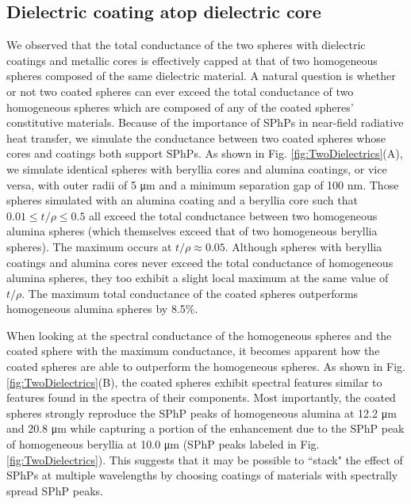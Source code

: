 \subsection{Dielectric coating atop dielectric core}

We observed that the total conductance of the two spheres with dielectric coatings and metallic cores is effectively capped at that of two homogeneous spheres composed of the same dielectric material. A natural question is whether or not two coated spheres can ever exceed the total conductance of two homogeneous spheres which are composed of any of the coated spheres' constitutive materials. Because of the importance of SPhPs in near-field radiative heat transfer, we simulate the conductance between two coated spheres whose cores and coatings both support SPhPs. As shown in Fig. \ref{fig:TwoDielectrics}(A), we simulate identical spheres with beryllia\cite{Palik1985} cores and alumina\cite{Palik1985} coatings, or vice versa, with outer radii of 5 \si{\micro\meter} and a minimum separation gap of 100 \si{\nano\meter}. Those spheres simulated with an alumina coating and a beryllia core such that $0.01 \le t/\rho \le 0.5$ all exceed the total conductance between two homogeneous alumina spheres (which themselves exceed that of two homogeneous beryllia spheres). The maximum occurs at $t/\rho \approx 0.05$. Although spheres with beryllia coatings and alumina cores never exceed the total conductance of homogeneous alumina spheres, they too exhibit a slight local maximum at the same value of $t/\rho$. The maximum total conductance of the coated spheres outperforms homogeneous alumina spheres by 8.5\%.

When looking at the spectral conductance of the homogeneous spheres and the coated sphere with the maximum conductance, it becomes apparent how the coated spheres are able to outperform the homogeneous spheres. As shown in Fig. \ref{fig:TwoDielectrics}(B), the coated spheres exhibit spectral features similar to features found in the spectra of their components. Most importantly, the coated spheres strongly reproduce the SPhP peaks of homogeneous alumina at 12.2 \si{\micro\meter} and 20.8 \si{\micro\meter} while capturing a portion of the enhancement due to the SPhP peak of homogeneous beryllia at 10.0 \si{\micro\meter} (SPhP peaks labeled in Fig. \ref{fig:TwoDielectrics}). This suggests that it may be possible to ``stack" the effect of SPhPs at multiple wavelengths by choosing coatings of materials with spectrally spread SPhP peaks.

